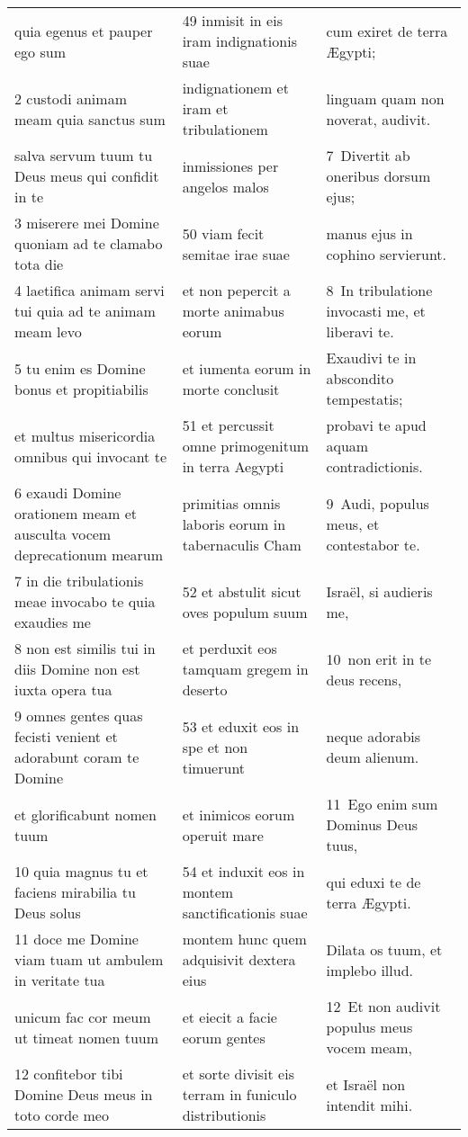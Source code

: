 \documentclass{article}
\begin{document}
\begin{longtable}{@{}p{}p{}p{}@{}}
quia egenus et pauper ego sum	&	49 inmisit in eis iram indignationis suae	&	cum exiret de terra Ægypti;	\\
2 custodi animam meam quia sanctus sum	&	indignationem et iram et tribulationem	&	linguam quam non noverat, audivit.	\\
salva servum tuum tu Deus meus qui confidit in te	&	inmissiones per angelos malos	&	7 Divertit ab oneribus dorsum ejus;	\\
3 miserere mei Domine quoniam ad te clamabo tota die	&	50 viam fecit semitae irae suae	&	manus ejus in cophino servierunt.	\\
4 laetifica animam servi tui quia ad te animam meam levo	&	et non pepercit a morte animabus eorum	&	8 In tribulatione invocasti me, et liberavi te.	\\
5 tu enim es Domine bonus et propitiabilis	&	et iumenta eorum in morte conclusit	&	Exaudivi te in abscondito tempestatis;	\\
et multus misericordia omnibus qui invocant te	&	51 et percussit omne primogenitum in terra Aegypti	&	probavi te apud aquam contradictionis.	\\
6 exaudi Domine orationem meam et ausculta vocem deprecationum mearum	&	primitias omnis laboris eorum in tabernaculis Cham	&	9 Audi, populus meus, et contestabor te.	\\
7 in die tribulationis meae invocabo te quia exaudies me	&	52 et abstulit sicut oves populum suum	&	Israël, si audieris me,	\\
8 non est similis tui in diis Domine non est iuxta opera tua	&	et perduxit eos tamquam gregem in deserto	&	10 non erit in te deus recens,	\\
9 omnes gentes quas fecisti venient et adorabunt coram te Domine	&	53 et eduxit eos in spe et non timuerunt	&	neque adorabis deum alienum.	\\
et glorificabunt nomen tuum	&	et inimicos eorum operuit mare	&	11 Ego enim sum Dominus Deus tuus,	\\
10 quia magnus tu et faciens mirabilia tu Deus solus	&	54 et induxit eos in montem sanctificationis suae	&	qui eduxi te de terra Ægypti.	\\
11 doce me Domine viam tuam ut ambulem in veritate tua	&	montem hunc quem adquisivit dextera eius	&	Dilata os tuum, et implebo illud.	\\
unicum fac cor meum ut timeat nomen tuum	&	et eiecit a facie eorum gentes	&	12 Et non audivit populus meus vocem meam,	\\
12 confitebor tibi Domine Deus meus in toto corde meo	&	et sorte divisit eis terram in funiculo distributionis	&	et Israël non intendit mihi.	\\

\end{longtable}
\end{document}
